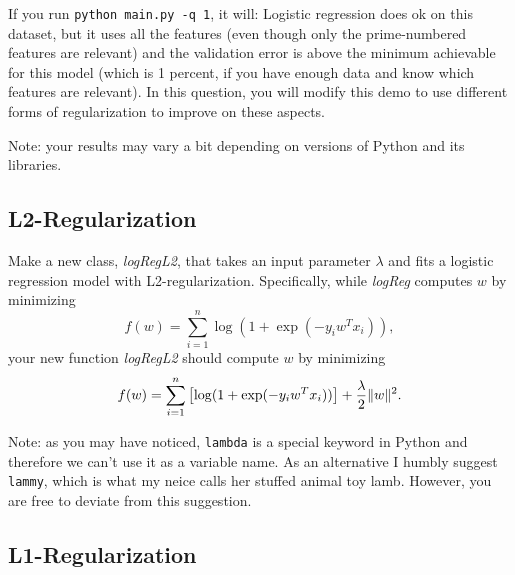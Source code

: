 \documentclass{article}
\begin{document}
If you run  \verb|python main.py -q 1|, it will:
Logistic regression does ok on this dataset, 
but it uses all the features (even though only the prime-numbered features are relevant) 
and the validation error is above the minimum achievable for this model 
(which is 1 percent, if you have enough data and know which features are relevant). 
In this question, you will modify this demo to use different forms of regularization
 to improve on these aspects.

Note: your results may vary a bit depending on versions of Python and its libraries.


\subsection{L2-Regularization}

Make a new class, \emph{logRegL2}, that takes an input parameter $\lambda$ and fits a logistic regression model with L2-regularization. Specifically, while \emph{logReg} computes $w$ by minimizing
\[
f(w) = \sum_{i=1}^n \log(1+\exp(-y_iw^Tx_i)),
\]
your new function \emph{logRegL2} should compute $w$ by minimizing
\[
f(w) = \sum_{i=1}^n \left[\log(1+\exp(-y_iw^Tx_i))\right] + \frac{\lambda}{2}\|w\|^2.
\]

Note: as you may have noticed, \texttt{lambda} is a special keyword in Python and therefore we can't use it as a variable name. 
As an alternative I humbly suggest \texttt{lammy}, which is what my neice calls her stuffed animal toy lamb.
However, you are free to deviate from this suggestion. 


\subsection{L1-Regularization}
\end{document}
